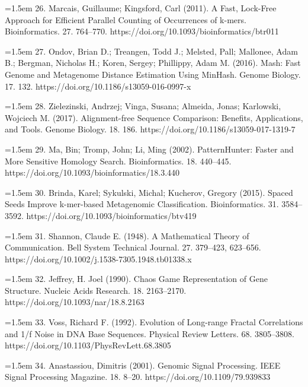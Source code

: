 \documentclass[11pt]{article}
\begin{document}
\hangindent=1.5em  26. Marcais, Guillaume; Kingsford, Carl (2011). A Fast, Lock-Free Approach for Efficient Parallel Counting of Occurrences of k-mers. Bioinformatics. 27. 764--770. https://doi.org/10.1093/bioinformatics/btr011\par

\hangindent=1.5em  27. Ondov, Brian D.; Treangen, Todd J.; Melsted, Pall; Mallonee, Adam B.; Bergman, Nicholas H.; Koren, Sergey; Phillippy, Adam M. (2016). Mash: Fast Genome and Metagenome Distance Estimation Using MinHash. Genome Biology. 17. 132. https://doi.org/10.1186/s13059-016-0997-x\par

\hangindent=1.5em  28. Zielezinski, Andrzej; Vinga, Susana; Almeida, Jonas; Karlowski, Wojciech M. (2017). Alignment-free Sequence Comparison: Benefits, Applications, and Tools. Genome Biology. 18. 186. https://doi.org/10.1186/s13059-017-1319-7\par

\hangindent=1.5em  29. Ma, Bin; Tromp, John; Li, Ming (2002). PatternHunter: Faster and More Sensitive Homology Search. Bioinformatics. 18. 440--445. https://doi.org/10.1093/bioinformatics/18.3.440\par

\hangindent=1.5em  30. Brinda, Karel; Sykulski, Michal; Kucherov, Gregory (2015). Spaced Seeds Improve k-mer-based Metagenomic Classification. Bioinformatics. 31. 3584--3592. https://doi.org/10.1093/bioinformatics/btv419\par

\hangindent=1.5em  31. Shannon, Claude E. (1948). A Mathematical Theory of Communication. Bell System Technical Journal. 27. 379--423, 623--656. https://doi.org/10.1002/j.1538-7305.1948.tb01338.x\par

\hangindent=1.5em  32. Jeffrey, H. Joel (1990). Chaos Game Representation of Gene Structure. Nucleic Acids Research. 18. 2163--2170. https://doi.org/10.1093/nar/18.8.2163\par

\hangindent=1.5em  33. Voss, Richard F. (1992). Evolution of Long-range Fractal Correlations and 1/f Noise in DNA Base Sequences. Physical Review Letters. 68. 3805--3808. https://doi.org/10.1103/PhysRevLett.68.3805\par

\hangindent=1.5em  34. Anastassiou, Dimitris (2001). Genomic Signal Processing. IEEE Signal Processing Magazine. 18. 8--20. https://doi.org/10.1109/79.939833\par
\end{document}
